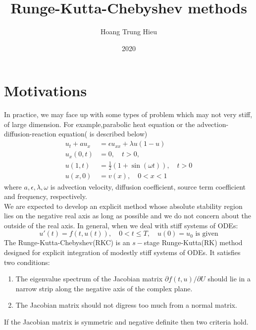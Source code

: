 \documentclass{article}
\theoremstyle{theorem}
\theoremstyle{definition}
\begin{document}
	
	
	\title{Runge-Kutta-Chebyshev methods}
	
	\author{Hoang Trung Hieu
	}                      
	\date{2020}
	\maketitle
	
	\noindent  
	\section{Motivations}
	 
	 In practice, we may face up with some types of problem which may not very stiff, of large dimension. For example,parabolic heat equation or the advection-diffusion-reaction equation( is described below)
	\[ \begin{aligned}
	 	u_t+au_x&=\epsilon u_{xx} + \lambda u(1-u) \\
	 	u_x(0,t)&=0, \quad t>0, \\
	 	u(1,t)&=\frac{1}{2}(1+\sin(\omega t)), \quad t>0 \\
	 	u(x,0)&=v(x), \quad 0<x<1
	\end{aligned} \] where $a, \epsilon , \lambda , \omega$ is advection velocity, diffusion coefficient, source term coefficient and frequency, respectively.\\
	We are expected to develop an explicit method whose absolute stability region lies on the negative real axis as long as possible and we do not concern about the outside of the real axis. In general, when we deal with stiff systems of ODEs: $$u'(t)=f(t,u(t)), \quad 0 <t \le T, \quad u(0)=u_0 \text{ is given}$$ The Runge-Kutta-Chebyshev(RKC) is an $s-$stage Runge-Kutta(RK) method designed for explicit integration of modestly stiff systems of ODEs. It satisfies two conditions:
	\begin{enumerate}[label=(\roman*)]
		\item The eigenvalue spectrum of the Jacobian matrix $\partial f(t,u)/ \partial U$ should lie in a narrow strip along the negative axis of the complex plane.
		\item 	The Jacobian matrix should not digress too much from a normal matrix.
	\end{enumerate}
If the Jacobian matrix is symmetric and negative definite then two criteria hold.
	 
\end{document}
